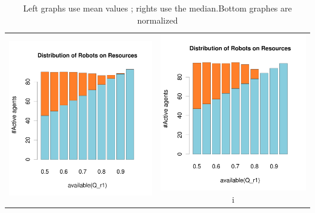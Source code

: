 \documentclass[a4paper,10pt]{article}
\begin{document}
\begin{table}[H]
\caption{Left graphs use mean values ; rights use the median.Bottom graphes are normalized}
\begin{tabular}{cc}

\includegraphics[width=\imgSize]{../images/5StaticEnv/barplotAliveR1AndR2_mean_env1}& \includegraphics[width=\imgSize]{../images/5StaticEnv/barplotAliveR1AndR2_median_env1}i\\

\end{tabular}
\end{table}
\end{document}
